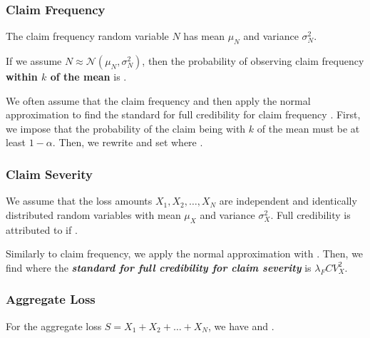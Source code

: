 \documentclass[english]{article}
\begin{document}
\begin{multicols*}{2}
\subsubsection{Claim Frequency}
The claim frequency random variable $N$ has mean $\mu_{N}$ and variance $\sigma^{2}_{N}$. 

If we assume $N \approx \mathcal{N}(\mu_{N}, \sigma^{2}_{N})$, then the probability of observing claim frequency \textbf{within $k$ of the mean} is .

\bigskip

We often assume that the claim frequency  and then apply the normal approximation to find the standard for full credibility for claim frequency . First, we impose that the probability of the claim being with $k$ of the mean must be at least $1 - \alpha$. Then, we rewrite  and set  where .


\subsubsection{Claim Severity}
We assume that the loss amounts $X_{1}, X_{2}, \dots, X_{N}$ are independent and identically distributed random variables with mean $\mu_{X}$ and variance $\sigma^{2}_{X}$. Full credibility is attributed to  if . 

\bigskip

Similarly to claim frequency, we apply the normal approximation with . Then, we find  where the \textbf{\textit{standard for full credibility for claim severity}} is $\lambda_{F}CV_{X}^{2}$.


\subsubsection{Aggregate Loss}
For the aggregate loss $S = X_{1} + X_{2} + \hdots + X_{N}$, we have  and .


\end{multicols*}
\end{document}
